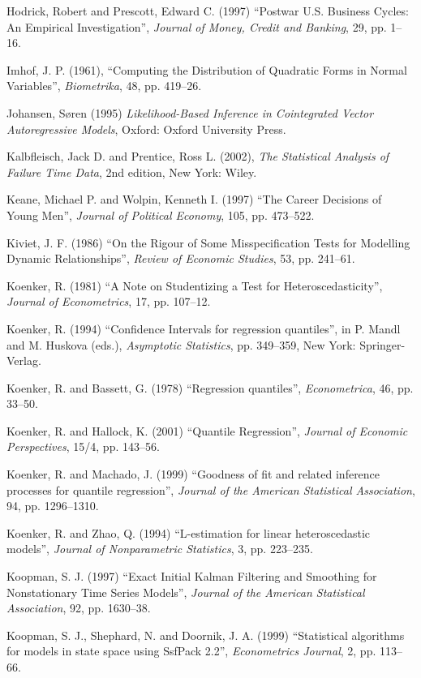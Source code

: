 \begin{thebibliography}
  Hodrick, Robert and Prescott, Edward C. (1997) ``Postwar U.S. Business
  Cycles: An Empirical Investigation'', \emph{Journal of Money, Credit and
  Banking}, 29, pp. 1--16.

  Imhof, J. P. (1961), ``Computing the Distribution of Quadratic Forms
  in Normal Variables'', \emph{Biometrika}, 48, pp. 419--26.

  Johansen, S\o{}ren (1995) \emph{Likelihood-Based Inference in
    Cointegrated Vector Autoregressive Models}, Oxford: Oxford
  University Press.

  Kalbfleisch, Jack D. and Prentice, Ross L. (2002), \emph{The
    Statistical Analysis of Failure Time Data}, 2nd edition, New York:
  Wiley.

  Keane, Michael P. and Wolpin, Kenneth I. (1997) ``The Career
  Decisions of Young Men'', \emph{Journal of Political Economy}, 105,
  pp. 473--522.

  Kiviet, J. F. (1986) ``On the Rigour of Some Misspecification Tests
  for Modelling Dynamic Relationships'', \emph{Review of Economic
    Studies}, 53, pp. 241--61.

  Koenker, R. (1981) ``A Note on Studentizing a Test for
  Heteroscedasticity'', \emph{Journal of Econometrics}, 17,
  pp. 107--12.

  Koenker, R. (1994) ``Confidence Intervals for regression
  quantiles'', in P. Mandl and M. Huskova (eds.), \emph{Asymptotic
    Statistics}, pp. 349--359, New York: Springer-Verlag.

  Koenker, R. and Bassett, G. (1978) ``Regression quantiles'',
  \emph{Econometrica}, 46, pp. 33--50.

  Koenker, R. and Hallock, K. (2001) ``Quantile Regression'',
  \emph{Journal of Economic Perspectives}, 15/4, pp. 143--56.

  Koenker, R. and Machado, J. (1999) ``Goodness of fit and related
  inference processes for quantile regression'', \emph{Journal of the
    American Statistical Association}, 94, pp. 1296--1310.

  Koenker, R. and Zhao, Q. (1994) ``L-estimation for linear
  heteroscedastic models'', \emph{Journal of Nonparametric
    Statistics}, 3, pp. 223--235.

  Koopman, S. J. (1997) ``Exact Initial Kalman Filtering and
  Smoothing for Nonstationary Time Series Models'', \emph{Journal of
    the American Statistical Association}, 92, pp. 1630--38.

  Koopman, S. J., Shephard, N. and Doornik, J. A. (1999) 
  ``Statistical algorithms for models in state space using SsfPack
  2.2'', \emph{Econometrics Journal}, 2, pp. 113--66.


\end{thebibliography}
